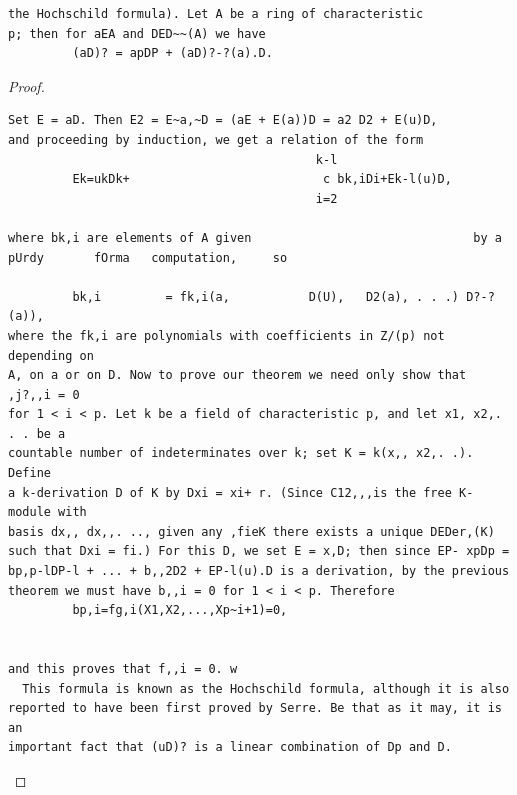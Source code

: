 \begin{theorem}\label{mcrt-auto-theorem-25-5}\uses{}
\begin{verbatim}
the Hochschild formula). Let A be a ring of characteristic
p; then for aEA and DED~~(A) we have
         (aD)? = apDP + (aD)?-?(a).D.
\end{verbatim}
\end{theorem}
\begin{proof}
\begin{verbatim}
Set E = aD. Then E2 = E~a,~D = (aE + E(a))D = a2 D2 + E(u)D,
and proceeding by induction, we get a relation of the form
                                           k-l
         Ek=ukDk+                           c bk,iDi+Ek-l(u)D,
                                           i=2

where bk,i are elements of A given                               by a pUrdy       fOrma   computation,     so

         bk,i         = fk,i(a,           D(U),   D2(a), . . .) D?-?(a)),
where the fk,i are polynomials with coefficients in Z/(p) not depending on
A, on a or on D. Now to prove our theorem we need only show that ,j?,,i = 0
for 1 < i < p. Let k be a field of characteristic p, and let x1, x2,. . . be a
countable number of indeterminates over k; set K = k(x,, x2,. .). Define
a k-derivation D of K by Dxi = xi+ r. (Since C12,,,is the free K-module with
basis dx,, dx,,. .., given any ,fieK there exists a unique DEDer,(K)
such that Dxi = fi.) For this D, we set E = x,D; then since EP- xpDp =
bp,p-lDP-l + ... + b,,2D2 + EP-l(u).D is a derivation, by the previous
theorem we must have b,,i = 0 for 1 < i < p. Therefore
         bp,i=fg,i(X1,X2,...,Xp~i+1)=0,


and this proves that f,,i = 0. w
  This formula is known as the Hochschild formula, although it is also
reported to have been first proved by Serre. Be that as it may, it is an
important fact that (uD)? is a linear combination of Dp and D.
\end{verbatim}
\end{proof}



